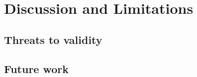 \chapter{Discussion and Limitations}\label{ch:discussion}

\section{Threats to validity}
\section{Future work}
